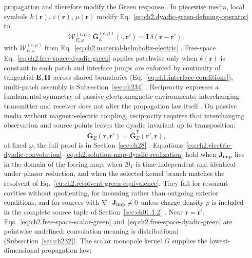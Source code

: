 propagation and therefore modify the Green response \cite{collin2001}.
In piecewise media, local symbols \(k(\mathbf{r})\), \(\varepsilon(\mathbf{r})\),
\(\mu(\mathbf{r})\) modify Eq.~\eqref{eq:ch2.dyadic-green-defining-operator} to
\begin{equation}
\label{eq:ch2.material-dyadic-defining-operator}
\mathcal{W}_{E,\omega}^{(\varepsilon,\mu)}\,
\overline{\mathbf{G}}_{E}^{(\varepsilon,\mu)}(\cdot,\mathbf{r}')
=
\overline{\mathbf{I}}\,\delta(\mathbf{r}-\mathbf{r}'),
\end{equation}
with \(\mathcal{W}_{E,\omega}^{(\varepsilon,\mu)}\) from
Eq.~\eqref{eq:ch2.material-helmholtz-electric} \cite{stratton1941}. Free-space
Eq.~\eqref{eq:ch2.free-space-dyadic-green} applies patchwise only when
\(k(\mathbf{r})\) is constant in each patch and interface jumps are enforced by
continuity of tangential \(\mathbf{E},\mathbf{H}\) across shared boundaries
(Eq.~\eqref{eq:ch1.interface-conditions}); multi-patch assembly is
Subsection~\ref{sec:ch234} \cite{harrington2001}. Reciprocity expresses a fundamental
symmetry of passive electromagnetic environments: interchanging transmitter and receiver
does not alter the propagation law itself \cite{stratton1941}. On passive media without
magneto-electric coupling, reciprocity requires that interchanging observation and
source points leaves the dyadic invariant up to transposition:
\begin{equation}
\label{eq:ch2.dyadic-reciprocity-swap}
\overline{\mathbf{G}}_{E}(\mathbf{r},\mathbf{r}')
=
\overline{\mathbf{G}}_{E}^{\mathsf{T}}(\mathbf{r}',\mathbf{r}),
\end{equation}
at fixed $\omega$; the full proof is in Section~\ref{sec:ch28} \cite{stratton1941}.
Equations~\eqref{eq:ch2.electric-dyadic-convolution}--\eqref{eq:ch2.solution-map-dyadic-realization}
hold when \(\mathbf{J}_{\mathrm{imp}}\) lies in the domain of the forcing map, when
\(\mathcal{B}_\Gamma\) is time-independent and identical under phasor reduction, and
when the selected kernel branch matches the resolvent of
Eq.~\eqref{eq:ch2.resolvent-green-equivalence}. They fail for resonant cavities
without quotienting, for incoming rather than outgoing exterior conditions, and for
sources with \(\nabla\cdot\mathbf{J}_{\mathrm{imp}}\neq 0\) unless charge density \(\rho\) is included in the
complete source tuple of Section~\ref{sec:ch01.1.2} \cite{stratton1941}.
Near \(\mathbf{r}=\mathbf{r}'\), Eqs.~\eqref{eq:ch2.free-space-scalar-green}
and~\eqref{eq:ch2.free-space-dyadic-green} are pointwise undefined; convolution
meaning is distributional (Subsection~\ref{sec:ch232}).
The scalar monopole kernel $G$ supplies the lowest-dimensional propagation law;
